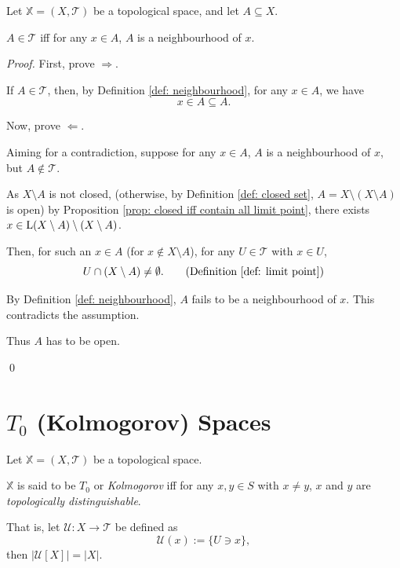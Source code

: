 \begin{proposition}
	Let $\mathbb X = (X, \mathcal T)$ be a topological space, and let $A \subseteq X$.
	
	$A \in \mathcal T$ iff for any $x \in A$, $A$ is a neighbourhood of $x$.
	
	\begin{proof}
		First, prove $\Rightarrow$.
		
		If $A \in \mathcal T$, then, by Definition \ref{def: neighbourhood}, for any $x \in A$, we have
		$$
		x \in A \subseteq A.
		$$
		
		\qedlm
		
		Now, prove $\Leftarrow$.
		
		Aiming for a contradiction, suppose for any $x \in A$, $A$ is a neighbourhood of $x$, but $A\notin \mathcal T$.
		
		As $X \setminus A$ is not closed, (otherwise, by Definition \ref{def: closed set}, $A = X \setminus (X \setminus A)$ is open) by Proposition \ref{prop: closed iff contain all limit point}, there exists $x \in \mathrm{L}(X \setminus A) \setminus (X \setminus A)$.
		
		Then, for such an $x \in A$ (for $x \notin X \setminus A$), for any $U \in \mathcal T$ with $x \in U$,
		$$
		U \cap (X \setminus A) \ne \emptyset. \qquad \text{(Definition \ref{def: limit point})}
		$$
		
		By Definition \ref{def: neighbourhood}, $A$ fails to be a neighbourhood of $x$. This contradicts the assumption.
		
		Thus $A$ has to be open.
		
		\qed
	\end{proof}
\end{proposition}



\section{$T_0$ (Kolmogorov) Spaces}


\begin{definition}
	\label{def: T0 space}
	Let $\mathbb X = (X, \mathcal T)$ be a topological space.
	
	$\mathbb X$ is said to be $T_0$ or \textit{Kolmogorov} iff for any $x,y \in S$ with $x \ne y$, $x$ and $y$ are \textit{topologically distinguishable}.
	
	That is, let $\mathcal U: X \to \mathcal T$ be defined as
	$$
	\mathcal U(x) := \{U \ni x\},
	$$
	then $|\mathcal U[X]| = |X|$.
\end{definition}


